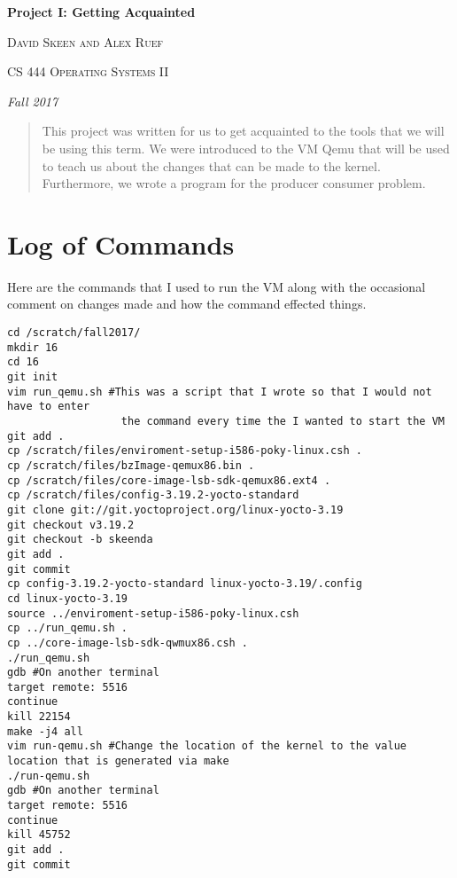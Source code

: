 \documentclass[10pt,onecolumn]{article}
\begin{document}
               
\begin{titlepage}
\centering
{\huge\bfseries Project I: Getting Acquainted\par}
\vspace{.5cm}
{\scshape David Skeen and Alex Ruef \par}
\vspace{.5cm}   
{\scshape CS 444 Operating Systems II\par}
\vspace{.5cm} 
{\Large\itshape Fall 2017\par}
\par
\par
\begin{abstract}
This project was written for us to get acquainted to the tools that we will
be using this term. We were introduced to the VM Qemu that will be used
to teach us about the changes that can be made to the kernel. Furthermore, 
we wrote a program for the producer consumer problem.
\end{abstract}
\end{titlepage}


\section{Log of Commands}
Here are the commands that I used to run the VM along with the occasional comment
on changes made and how the command effected things.
\begin{verbatim}
cd /scratch/fall2017/
mkdir 16
cd 16
git init
vim run_qemu.sh #This was a script that I wrote so that I would not have to enter
                  the command every time the I wanted to start the VM
git add .
cp /scratch/files/enviroment-setup-i586-poky-linux.csh .
cp /scratch/files/bzImage-qemux86.bin .
cp /scratch/files/core-image-lsb-sdk-qemux86.ext4 .
cp /scratch/files/config-3.19.2-yocto-standard
git clone git://git.yoctoproject.org/linux-yocto-3.19
git checkout v3.19.2
git checkout -b skeenda
git add .
git commit
cp config-3.19.2-yocto-standard linux-yocto-3.19/.config
cd linux-yocto-3.19
source ../enviroment-setup-i586-poky-linux.csh
cp ../run_qemu.sh .
cp ../core-image-lsb-sdk-qwmux86.csh .
./run_qemu.sh
gdb #On another terminal
target remote: 5516
continue
kill 22154
make -j4 all
vim run-qemu.sh #Change the location of the kernel to the value location that is generated via make
./run-qemu.sh
gdb #On another terminal
target remote: 5516
continue
kill 45752
git add .
git commit
\end{verbatim}
\end{document}
